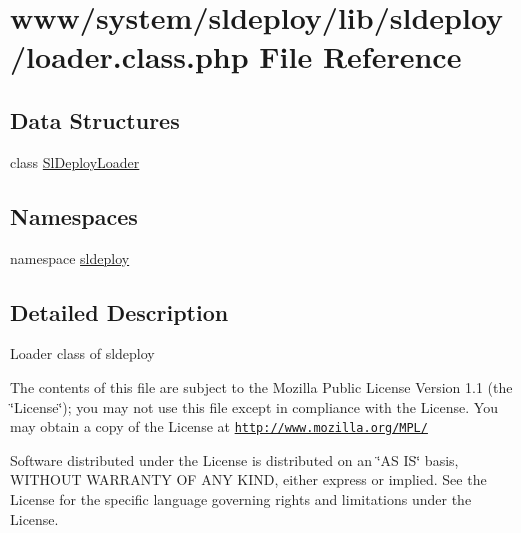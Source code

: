 \hypertarget{loader_8class_8php}{
\section{www/system/sldeploy/lib/sldeploy/loader.class.php File Reference}
\label{loader_8class_8php}
}
\subsection*{Data Structures}
\begin{DoxyCompactItemize}
\item 
class \hyperlink{class_sl_deploy_loader}{SlDeployLoader}
\end{DoxyCompactItemize}
\subsection*{Namespaces}
\begin{DoxyCompactItemize}
\item 
namespace \hyperlink{namespacesldeploy}{sldeploy}
\end{DoxyCompactItemize}


\subsection{Detailed Description}
Loader class of sldeploy

The contents of this file are subject to the Mozilla Public License Version 1.1 (the \char`\"{}License\char`\"{}); you may not use this file except in compliance with the License. You may obtain a copy of the License at \href{http://www.mozilla.org/MPL/}{\tt http://www.mozilla.org/MPL/}

Software distributed under the License is distributed on an \char`\"{}AS IS\char`\"{} basis, WITHOUT WARRANTY OF ANY KIND, either express or implied. See the License for the specific language governing rights and limitations under the License. 